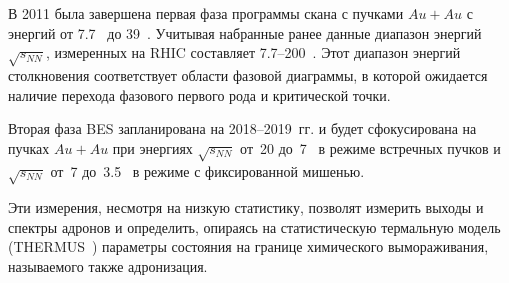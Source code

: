 
В 2011 была завершена первая фаза программы скана с пучками $Au+Au$ с энергий от 7.7~\GeVperNucl{} до 39~\GeVperNucl. Учитывая набранные ранее данные диапазон энергий $\sqrt{s_{NN}}$, измеренных на RHIC составляет 7.7--200~\GeVperNucl. Этот диапазон энергий столкновения соответствует области фазовой диаграммы, в которой ожидается наличие перехода фазового первого рода и критической точки.


Вторая фаза BES запланирована на 2018--2019~гг. и будет сфокусирована на пучках $Au+Au$ при энергиях $\sqrt{s_{NN}}$ от~20 до~7~\GeVperNucl{} в режиме встречных пучков и $\sqrt{s_{NN}}$ от~7 до~3.5~\GeVperNucl{} в режиме с фиксированной мишенью.






Эти измерения, несмотря на низкую статистику, позволят измерить выходы и спектры адронов и определить, опираясь на статистическую термальную модель (THERMUS~\cite{}) параметры состояния на границе химического вымораживания, называемого также адронизация.


